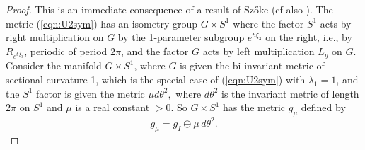 \documentclass[12pt,reqno]{amsart}\usepackage{amssymb,amsmath,amscd,epsfig,amsthm,enumerate,import,eufrak}
\theoremstyle{definition}
\theoremstyle{remark}
\numberwithin{equation}{section}
\theoremstyle{plain}
\theoremstyle{definition}
\theoremstyle{remark}
\numberwithin{theorem}{section}
\begin{document}
\begin{proof} This is an immediate consequence of a result of Sz\H{o}ke \cite{s2} (cf also \cite{a1}). The metric (\ref{eqn:U2sym}) has an isometry group $G \times S^1$ where the factor $S^1$ acts by right multiplication on $G$ by the 1-parameter subgroup $e^{t\, \xi_3}$ on the right, i.e., by $R_{e^{t\, \xi_3}}$, periodic of period $2\pi$, and the factor $G$ acts by left multiplication $L_g$ on $G$. Consider the manifold $G \times S^1$, where $G$ is given the bi-invariant metric of sectional curvature 1, which is the special case of (\ref{eqn:U2sym}) with $\lambda_1= 1$, and the $S^1$ factor is given the metric $\mu d\theta^2,$ where $d\theta^2$ is the invariant metric of length $2\pi$ on $S^1$ and $\mu$ is a real constant $> 0$. So $G\times S^1$ has the metric $g_{\mu}$ defined by
%
\begin{equation}  \label{eqn:gmu}
	g_{\mu} = g_I \oplus \mu \, d\theta^2.
\end{equation}
%


\end{proof}
\end{document}
